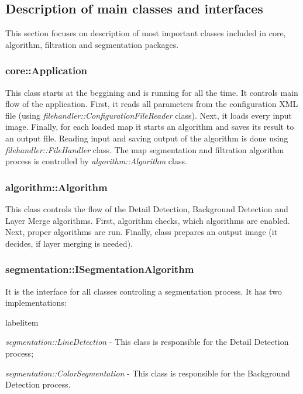 \documentclass[a4paper,onecolumn,oneside,12pt]{memoir}
\makeatletter
\renewenvironment{itemize}{
  \begin{list}{  
  \csname labelitem\romannumeral\the\@listdepth\endcsname}{
  \setlength{\leftmargin}{1em}
	\setlength{\topsep}{6pt}%
	\setlength{\partopsep}{0pt}%
	\setlength{\parskip}{0pt}%
	\setlength{\parsep}{0pt}%
	\setlength{\itemsep}{0pt}}
}{
  \end{list}
}
\makeatother
\begin{document}
\subsection{Description of main classes and interfaces}

This section focuses on description of most important classes included in core, algorithm,
filtration and segmentation packages.

\subsubsection{core::Application}

This class starts at the beggining and is running for all the time. It controls main flow of the
application. First, it reads all parameters from the configuration XML file (using 
\textit{filehandler::ConfigurationFileReader} class). Next, it loads every input image. Finally, for
each loaded map it starts an algorithm and saves its result to an output file. Reading input and
saving output of the algorithm is done using \textit{filehandler::FileHandler} class. The map
segmentation and filtration algorithm process is controlled by \textit{algorithm::Algorithm} class.

\subsubsection{algorithm::Algorithm}

This class controls the flow of the Detail Detection, Background Detection and Layer Merge
algorithms. First, algorithm checks, which algorithms are enabled. Next, proper algorithms are run.
Finally, class prepares an output image (it decides, if layer merging is needed).

\subsubsection{segmentation::ISegmentationAlgorithm}

It is the interface for all classes controling a segmentation process. It has two implementations:
\begin{itemize}
  \item \textit{segmentation::LineDetection} - This class is responsible for the Detail Detection
        process;
  \item \textit{segmentation::ColorSegmentation} - This class is responsible for the Background
        Detection process.
\end{itemize}
\end{document}
